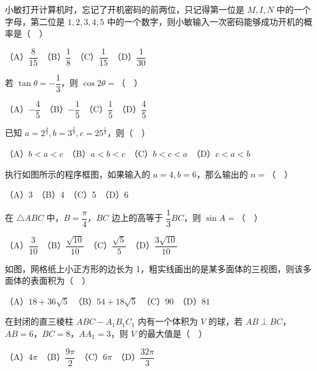 \begin{question}
小敏打开计算机时，忘记了开机密码的前两位，只记得第一位是 \(M,I,N\) 中的一个字母，第二位是 \(1,2,3,4,5\) 中的一个数字，则小敏输入一次密码能够成功开机的概率是（　）

（A）\(\dfrac8{15}\)　（B）\(\dfrac18\)　（C）\(\dfrac1{15}\)　（D）\(\dfrac1{30}\)

\end{question}
\begin{question}
若 \(\tan\theta=-\dfrac13\)，则 \(\cos2\theta=\)（　）

（A）\(-\dfrac45\)　（B）\(-\dfrac15\)　（C）\(\dfrac15\)　（D）\(\dfrac45\)

\end{question}
\begin{question}
已知 \(a=2^{\frac43}, b=3^{\frac23}, c=25^{\frac13}\)，则（　）

（A）\(b<a<c\)　（B）\(a<b<c\)　（C）\(b<c<a\)　（D）\(c<a<b\)

\Needspace{0.4\textheight}
\end{question}
\begin{question}
执行如图所示的程序框图，如果输入的 \(a=4,b=6\)，那么输出的 \(n=\)（　）
\nopagebreak[4]
\begin{center}\end{center}
\nopagebreak[4]
（A）3　（B）4　（C）5　（D）6

\end{question}
\begin{question}
在 \(\triangle ABC\) 中，\(B=\dfrac\pi4\)，\(BC\) 边上的高等于 \(\dfrac13BC\)，则 \(\sin A=\)（　）

（A）\(\dfrac3{10}\)　（B）\(\dfrac{\sqrt{10}}{10}\)　（C）\(\dfrac{\sqrt5}{5}\)　（D）\(\dfrac{3\sqrt{10}}{10}\)

\Needspace{0.4\textheight}
\end{question}
\begin{question}
如图，网格纸上小正方形的边长为 1，粗实线画出的是某多面体的三视图，则该多面体的表面积为（　）
\nopagebreak[4]
\begin{center}\end{center}
\nopagebreak[4]
（A）\(18+36\sqrt5\)　（B）\(54+18\sqrt5\)　（C）\(90\)　（D）\(81\)

\end{question}
\begin{question}
在封闭的直三棱柱 \(ABC-A_1B_1C_1\) 内有一个体积为 \(V\) 的球，若 \(AB\perp BC\)，\(AB=6\)，\(BC=8\)，\(AA_1=3\)，则 \(V\) 的最大值是（　）

（A）\(4\pi\)　（B）\(\dfrac{9\pi}{2}\)　（C）\(6\pi\)　（D）\(\dfrac{32\pi}{3}\)

\end{question}
